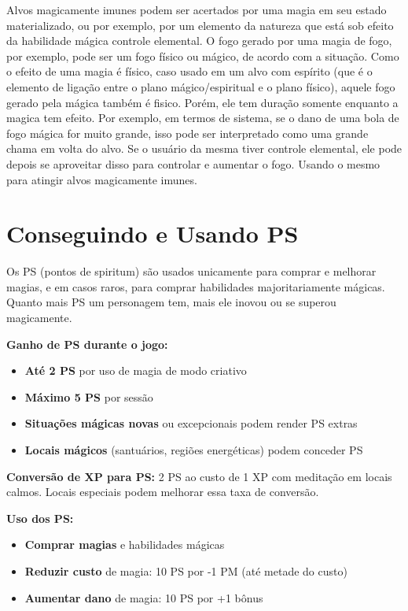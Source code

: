 Alvos magicamente imunes podem ser acertados por uma magia em seu estado materializado, ou por exemplo, por um elemento da natureza que está sob efeito da habilidade mágica controle elemental. O fogo gerado por uma magia de fogo, por exemplo, pode ser um fogo físico ou mágico, de acordo com a situação. Como o efeito de uma magia é físico, caso usado em um alvo com espírito (que é o elemento de ligação entre o plano mágico/espiritual e o plano físico), aquele fogo gerado pela mágica também é fisico. Porém, ele tem duração somente enquanto a magica tem efeito. Por exemplo, em termos de sistema, se o dano de uma bola de fogo mágica for muito grande, isso pode ser interpretado como uma grande chama em volta do alvo. Se o usuário da mesma tiver controle elemental, ele pode depois se aproveitar disso para controlar e aumentar o fogo. Usando o mesmo para atingir alvos magicamente imunes.



\section{Conseguindo e Usando PS}

Os PS (pontos de spiritum) são usados unicamente para comprar e melhorar magias, e em casos raros, para comprar habilidades majoritariamente mágicas. Quanto mais PS um personagem tem, mais ele inovou ou se superou magicamente.

\textbf{Ganho de PS durante o jogo:}
\begin{itemize}
    \item \textbf{Até 2 PS} por uso de magia de modo criativo
    \item \textbf{Máximo 5 PS} por sessão
    \item \textbf{Situações mágicas novas} ou excepcionais podem render PS extras
    \item \textbf{Locais mágicos} (santuários, regiões energéticas) podem conceder PS
\end{itemize}

\textbf{Conversão de XP para PS:}
2 PS ao custo de 1 XP com meditação em locais calmos. Locais especiais podem melhorar essa taxa de conversão.

\textbf{Uso dos PS:}
\begin{itemize}
    \item \textbf{Comprar magias} e habilidades mágicas
    \item \textbf{Reduzir custo} de magia: 10 PS por -1 PM (até metade do custo)
    \item \textbf{Aumentar dano} de magia: 10 PS por +1 bônus
\end{itemize} 


